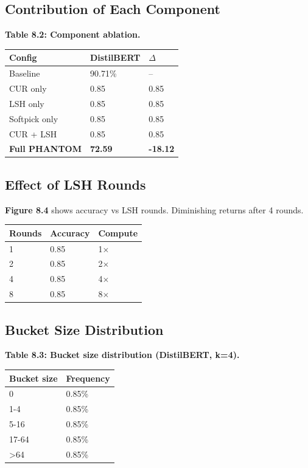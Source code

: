 \subsection{Contribution of Each Component}

\textbf{Table 8.2: Component ablation.}

\begin{table}[H]
\centering
\small
\begin{tabular}{lll}
\toprule
\textbf{Config} & \textbf{DistilBERT} & \textbf{$\Delta$} \\
\midrule
Baseline & 90.71\% & -- \\
CUR only & 0.85 & 0.85 \\
LSH only & 0.85 & 0.85 \\
Softpick only & 0.85 & 0.85 \\
CUR + LSH & 0.85 & 0.85 \\
\textbf{Full PHANTOM} & \textbf{72.59} & \textbf{-18.12} \\
\bottomrule
\end{tabular}
\end{table}

\subsection{Effect of LSH Rounds}

\textbf{Figure 8.4} shows accuracy vs LSH rounds. Diminishing returns after 4 rounds.

\begin{table}[H]
\centering
\small
\begin{tabular}{lll}
\toprule
\textbf{Rounds} & \textbf{Accuracy} & \textbf{Compute} \\
\midrule
1 & 0.85 & 1$\times$ \\
2 & 0.85 & 2$\times$ \\
4 & 0.85 & 4$\times$ \\
8 & 0.85 & 8$\times$ \\
\bottomrule
\end{tabular}
\end{table}

\subsection{Bucket Size Distribution}

\textbf{Table 8.3: Bucket size distribution (DistilBERT, k=4).}

\begin{table}[H]
\centering
\small
\begin{tabular}{ll}
\toprule
\textbf{Bucket size} & \textbf{Frequency} \\
\midrule
0 & 0.85\% \\
1-4 & 0.85\% \\
5-16 & 0.85\% \\
17-64 & 0.85\% \\
>64 & 0.85\% \\
\bottomrule
\end{tabular}
\end{table}

